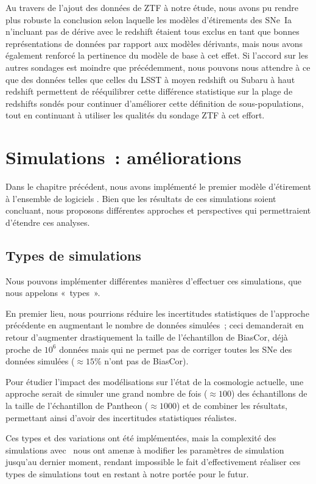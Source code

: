 \documentclass[../main/main.tex]{subfiles}
\begin{document}
Au travers de l'ajout des données de ZTF à notre étude, nous avons pu rendre
plus robuste la conclusion selon laquelle les modèles d'étirements des SNe~Ia
n'incluant pas de dérive avec le redshift étaient tous exclus en tant que bonnes
représentations de données par rapport aux modèles dérivants, mais nous avons
également renforcé la pertinence du modèle de base à cet effet. Si l'accord sur
les autres sondages est moindre que précédemment, nous pouvons nous attendre à
ce que des données telles que celles du LSST à moyen redshift ou Subaru à haut
redshift permettent de rééquilibrer cette différence statistique sur la plage de
redshifts sondés pour continuer d'améliorer cette définition de
sous-populations, tout en continuant à utiliser les qualités du sondage ZTF à
cet effort.

\section{Simulations~: améliorations}\label{sec:simpersp}

Dans le chapitre précédent, nous avons implémenté le premier modèle d'étirement
à l'ensemble de logiciels \snana. Bien que les résultats de ces simulations
soient concluant, nous proposons différentes approches et perspectives qui
permettraient d'étendre ces analyses.

\subsection{Types de simulations}\label{ssec:types}

Nous pouvons implémenter différentes manières d'effectuer ces simulations, que
nous appelons «~types~».

En premier lieu, nous pourrions réduire les incertitudes statistiques de
l'approche précédente en augmentant le nombre de données simulées~; ceci
demanderait en retour d'augmenter drastiquement la taille de l'échantillon de
BiasCor, déjà proche de $10^6$ données mais qui ne permet pas de corriger toutes
les SNe des données simulées ($\approx 15\%$ n'ont pas de BiasCor).

Pour étudier l'impact des modélisations sur l'état de la cosmologie actuelle,
une approche serait de simuler une grand nombre de fois ($\approx \num{100}$)
des échantillons de la taille de l'échantillon de Pantheon ($\approx
\num{1000}$) et de combiner les résultats, permettant ainsi d'avoir des
incertitudes statistiques réalistes.

Ces types et des variations ont été implémentées, mais la complexité des
simulations avec \snana\ nous ont amenæ à modifier les paramètres de simulation
jusqu'au dernier moment, rendant impossible le fait d'effectivement réaliser ces
types de simulations tout en restant à notre portée pour le futur.
\end{document}
